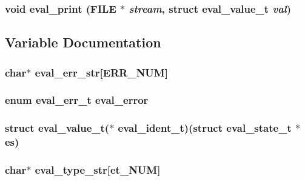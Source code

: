 \subsubsection[{eval\_\-print}]{\setlength{\rightskip}{0pt plus 5cm}void eval\_\-print (FILE $\ast$ {\em stream}, \/  struct {\bf eval\_\-value\_\-t} {\em val})}\label{eval_8h_9c764f7f765024c6e4a6e3ad42579870}




\subsection{Variable Documentation}
\subsubsection[{eval\_\-err\_\-str}]{\setlength{\rightskip}{0pt plus 5cm}char$\ast$ {\bf eval\_\-err\_\-str}[ERR\_\-NUM]}\label{eval_8h_70d2d836883e1ad468a472732ef7d43c}


\subsubsection[{eval\_\-error}]{\setlength{\rightskip}{0pt plus 5cm}enum {\bf eval\_\-err\_\-t} {\bf eval\_\-error}}\label{eval_8h_cdab0b4fdb81ae26dadd3a1cb2ee23bd}


\subsubsection[{eval\_\-ident\_\-t}]{\setlength{\rightskip}{0pt plus 5cm}struct {\bf eval\_\-value\_\-t}($\ast$ {\bf eval\_\-ident\_\-t})(struct {\bf eval\_\-state\_\-t} $\ast$es)}\label{eval_8h_d6803137df1dab73b5ccb093a54ae3ff}


\subsubsection[{eval\_\-type\_\-str}]{\setlength{\rightskip}{0pt plus 5cm}char$\ast$ {\bf eval\_\-type\_\-str}[et\_\-NUM]}\label{eval_8h_403ff3343cc15b30579e052830117ab2}


